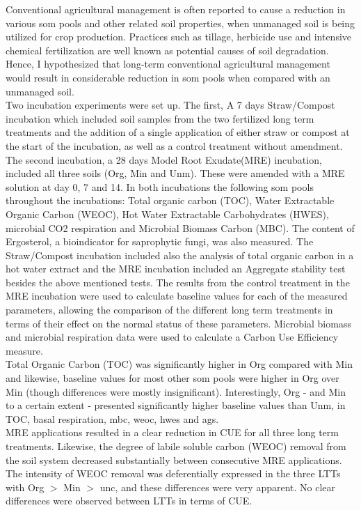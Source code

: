 	Conventional agricultural management is often reported to cause a reduction in various \gls{som} pools and other related soil properties, when unmanaged soil is being utilized for crop production. Practices such as tillage, herbicide use and intensive chemical fertilization are well known as potential causes of soil degradation. Hence, I hypothesized that long-term conventional agricultural management would result in considerable reduction in \gls{som} pools when compared with an unmanaged soil.\\
	Two incubation experiments were set up. The first, A 7 days Straw/Compost incubation which included soil samples from the two fertilized long term treatments and the addition of a single application of either straw or compost at the start of the incubation, as well as a control treatment without amendment. The second incubation, a 28 days Model Root Exudate(MRE) incubation, included all three soils (Org, Min and Unm). These were amended with a MRE solution at day 0, 7 and 14. In both incubations the following \gls{som} pools throughout the incubations: Total organic carbon (TOC), Water Extractable Organic Carbon (WEOC), Hot Water Extractable Carbohydrates (HWES), microbial CO2 respiration and Microbial Biomass Carbon (MBC). The content of Ergosterol, a bioindicator for saprophytic fungi, was also measured. The Straw/Compost incubation included also the analysis of total organic carbon in a hot water extract and the MRE incubation included an Aggregate stability test besides the above mentioned tests.  The results from the control treatment in the MRE incubation were used to calculate baseline values for each of the measured parameters, allowing the comparison of the different long term treatments in terms of their effect on the normal status of these parameters. Microbial biomass and microbial respiration data were used to calculate a Carbon Use Efficiency measure.\\
	Total Organic Carbon (TOC) was significantly higher in Org compared with Min and likewise, baseline values  for most other \gls{som} pools were higher in Org over Min (though differences were mostly insignificant). Interestingly, Org - and Min to a certain extent - presented significantly higher baseline values than Unm, in TOC, basal respiration, \gls{mbc}, \gls{weoc}, \gls{hwes} and \gls{ags}.\\ 
	MRE applications resulted in a clear reduction in CUE for all three long term treatments. Likewise, the degree of labile soluble carbon (WEOC) removal from the soil system decreased substantially between consecutive MRE applications. The intensity of WEOC removal was deferentially expressed in the three LTTs with Org $  > $ Min $ > $ \gls{unc}, and these differences were very apparent. No clear differences were observed between LTTs in terms of CUE.\\
